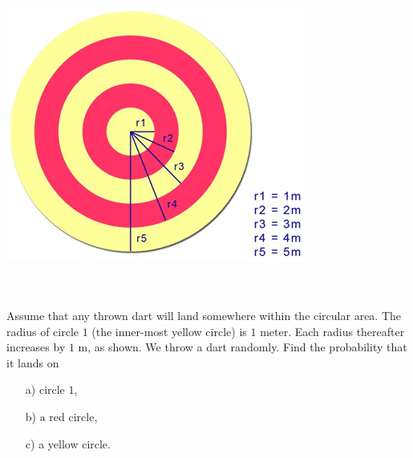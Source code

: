 \bigskip

\begin{problem}
     \\~\\
\begin{center}
\includegraphics[width=0.5\linewidth]{figs/prob1.png}
\end{center}
\\~\\
Assume that any thrown dart will land somewhere within the circular area. The radius of circle $1$ (the inner-most yellow circle) is $1$ meter. Each radius thereafter increases by $1$ m, as shown. We throw a dart randomly. Find the probability that it lands on
\begin{enumerate}
    \item[a) ] circle $1$,
    \item[b) ] a red circle,
    \item[c) ] a yellow circle.
    
\end{enumerate}
\end{problem}